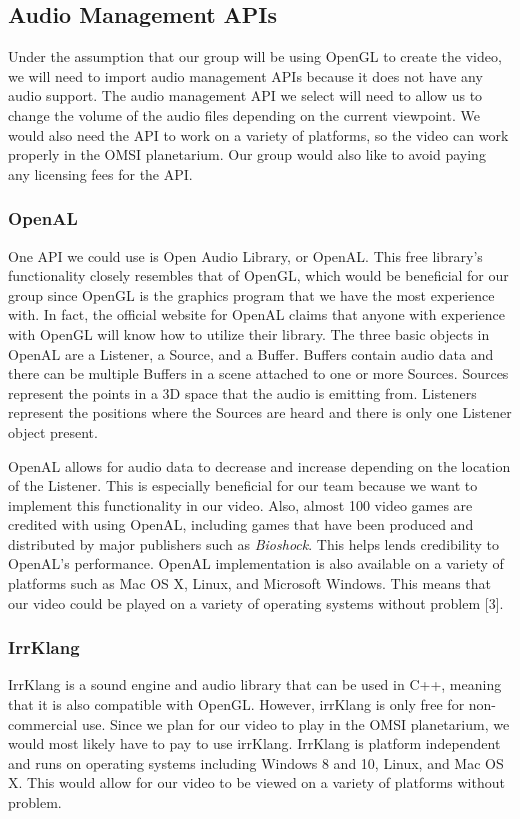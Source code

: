 \documentclass[onecolumn, draftclsnofoot,10pt, compsoc]{IEEEtran}
\begin{document}
\subsection{Audio Management APIs}
Under the assumption that our group will be using OpenGL to create the video, we will need to import audio management APIs because it does not have any audio support. The audio management API we select will need to allow us to change the volume of the audio files depending on the current viewpoint. We would also need the API to work on a variety of platforms, so the video can work properly in the OMSI planetarium. Our group would also like to avoid paying any licensing fees for the API.

\subsubsection{OpenAL}
One API we could use is Open Audio Library, or OpenAL. This free library's functionality closely resembles that of OpenGL, which would be beneficial for our group since OpenGL is the graphics program that we have the most experience with. In fact, the official website for OpenAL claims that anyone with experience with OpenGL will know how to utilize their library. The three basic objects in OpenAL are a Listener, a Source, and a Buffer. Buffers contain audio data and there can be multiple Buffers in a scene attached to one or more Sources. Sources represent the points in a 3D space that the audio is emitting from. Listeners represent the positions where the Sources are heard and there is only one Listener object present.


OpenAL allows for audio data to decrease and increase depending on the location of the Listener. This is especially beneficial for our team because we want to implement this functionality in our video. Also, almost 100 video games are credited with using OpenAL, including games that have been produced and distributed by major publishers such as \textit{Bioshock}. This helps lends credibility to OpenAL's performance. OpenAL implementation is also available on a variety of platforms such as Mac OS X, Linux, and Microsoft Windows. This means that our video could be played on a variety of operating systems without problem [3].


\subsubsection{IrrKlang}
IrrKlang is a sound engine and audio library that can be used in C++, meaning that it is also compatible with OpenGL. However, irrKlang is only free for non-commercial use. Since we plan for our video to play in the OMSI planetarium, we would most likely have to pay to use irrKlang. IrrKlang is platform independent and runs on operating systems including Windows 8 and 10, Linux, and Mac OS X. This would allow for our video to be viewed on a variety of platforms without problem. 
\end{document}

